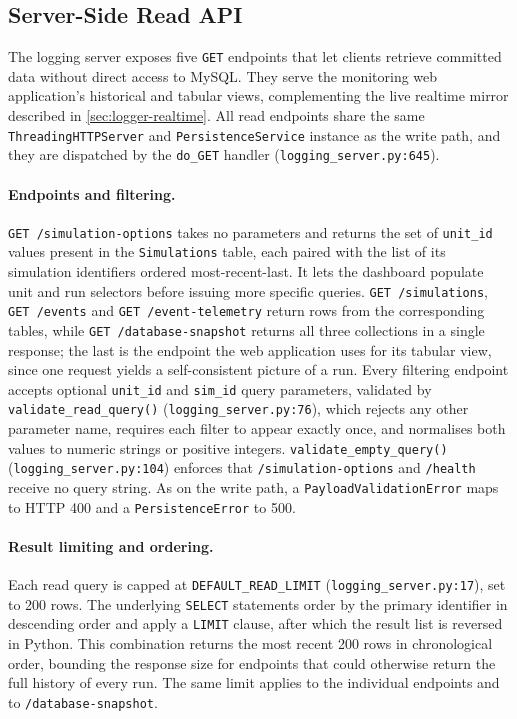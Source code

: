\subsection{Server-Side Read API}
\label{sec:logger-read-api}

The logging server exposes five \texttt{GET} endpoints that let clients retrieve committed data without direct access to MySQL. They serve the monitoring web application's historical and tabular views, complementing the live realtime mirror described in \cref{sec:logger-realtime}. All read endpoints share the same \texttt{ThreadingHTTPServer} and \texttt{PersistenceService} instance as the write path, and they are dispatched by the \texttt{do\_GET} handler (\texttt{logging\_server.py:645}).

\paragraph{Endpoints and filtering.}
\texttt{GET /simulation-options} takes no parameters and returns the set of \texttt{unit\_id} values present in the \texttt{Simulations} table, each paired with the list of its simulation identifiers ordered most-recent-last. It lets the dashboard populate unit and run selectors before issuing more specific queries. \texttt{GET /simulations}, \texttt{GET /events} and \texttt{GET /event-telemetry} return rows from the corresponding tables, while \texttt{GET /database-snapshot} returns all three collections in a single response; the last is the endpoint the web application uses for its tabular view, since one request yields a self-consistent picture of a run. Every filtering endpoint accepts optional \texttt{unit\_id} and \texttt{sim\_id} query parameters, validated by \texttt{validate\_read\_query()} (\texttt{logging\_server.py:76}), which rejects any other parameter name, requires each filter to appear exactly once, and normalises both values to numeric strings or positive integers. \texttt{validate\_empty\_query()} (\texttt{logging\_server.py:104}) enforces that \texttt{/simulation-options} and \texttt{/health} receive no query string. As on the write path, a \texttt{PayloadValidationError} maps to HTTP 400 and a \texttt{PersistenceError} to 500.

\paragraph{Result limiting and ordering.}
Each read query is capped at \texttt{DEFAULT\_READ\_LIMIT} (\texttt{logging\_server.py:17}), set to 200 rows. The underlying \texttt{SELECT} statements order by the primary identifier in descending order and apply a \texttt{LIMIT} clause, after which the result list is reversed in Python. This combination returns the most recent 200 rows in chronological order, bounding the response size for endpoints that could otherwise return the full history of every run. The same limit applies to the individual endpoints and to \texttt{/database-snapshot}.


